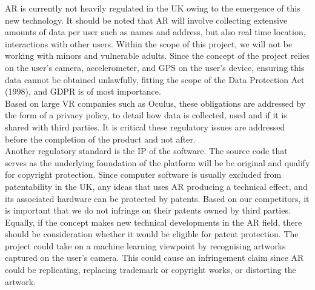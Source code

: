 
AR is currently not heavily regulated in the UK owing to the emergence of this new technology. It should be noted that AR will involve collecting extensive amounts of data per user such as names and address, but also real time location, interactions with other users. Within the scope of this project, we will not be working with minors and vulnerable adults. Since the concept of the project relies on the user's camera, accelerometer, and GPS on the user's device, ensuring this data cannot be obtained unlawfully, fitting the scope of the Data Protection Act (1998), and GDPR is of most importance.\cite{ITProPortal}\\

Based on large VR companies such as Oculus, these obligations are addressed by the form of a privacy policy, to detail how data is collected, used and if it is shared with third parties. It is critical these regulatory issues are addressed before the completion of the product and not after.\\

Another regulatory standard is the IP of the software. The source code that serves as the underlying foundation of the platform will be be original and qualify for copyright protection. Since computer software is usually excluded from patentability in the UK, any ideas that uses AR producing a technical effect, and its associated hardware can be protected by patents. Based on our competitors, it is important that we do not infringe on their patents owned by third parties.\\

Equally, if the concept makes new technical developments in the AR field, there should be consideration whether it would be eligible for patent protection. The project could take on a machine learning viewpoint by recognising artworks captured on the user's camera. This could cause an infringement claim since AR could be replicating, replacing trademark or copyright works, or distorting the artwork.